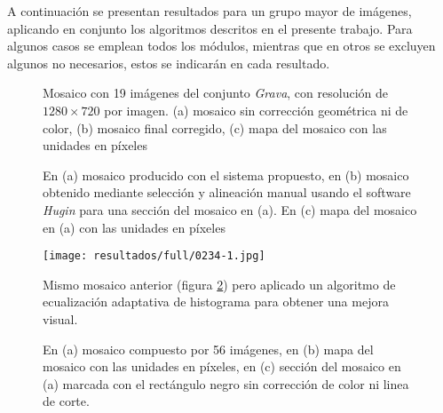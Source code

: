 A continuación se presentan resultados para un grupo mayor de imágenes, aplicando en conjunto los algoritmos descritos en el presente trabajo. Para algunos casos se emplean todos los módulos, mientras que en otros se excluyen algunos no necesarios, estos se indicarán en cada resultado.

\begin{figure}[H]
	\centering     %
		
	\caption[Mosaico del conjunto \textit{Grava}]{Mosaico con 19 imágenes del conjunto \textit{Grava}, con resolución de $1280\times 720$ por imagen. (a) mosaico sin corrección geométrica ni de color, (b) mosaico final corregido, (c) mapa del mosaico con las unidades en píxeles}
	\label{imagen:full:geo2}
\end{figure}

\begin{figure}[H]
	\centering     %
	
	\caption[Mosaico del conjunto \textit{Chuspa}]{En (a) mosaico producido con el sistema propuesto, en (b) mosaico obtenido mediante selección y alineación manual usando el software \textit{Hugin} para una sección del mosaico en (a). En (c) mapa del mosaico en (a) con las unidades en píxeles}
	\label{imagen:full:0234-map}
\end{figure}

\begin{figure}[H]
	\centering
	\texttt{[image: resultados/full/0234-1.jpg]}
	\caption[Mosaico mejorado visualmente del conjunto \textit{Chuspa}]{Mismo mosaico anterior (figura \ref{imagen:full:0234-map}) pero aplicado un algoritmo de ecualización adaptativa de histograma para obtener una mejora visual.}
	\label{imagen:full:0234-1}
\end{figure}

\begin{figure}[H]
	\centering     %
	
	\caption[Mosaico del conjunto \textit{ScottReef 25}]{En (a) mosaico compuesto por 56 imágenes, en (b) mapa del mosaico con las unidades en píxeles, en (c) sección del mosaico en (a) marcada con el rectángulo negro sin corrección de color ni linea de corte.}
	\label{imagen:full:SR}
\end{figure}


